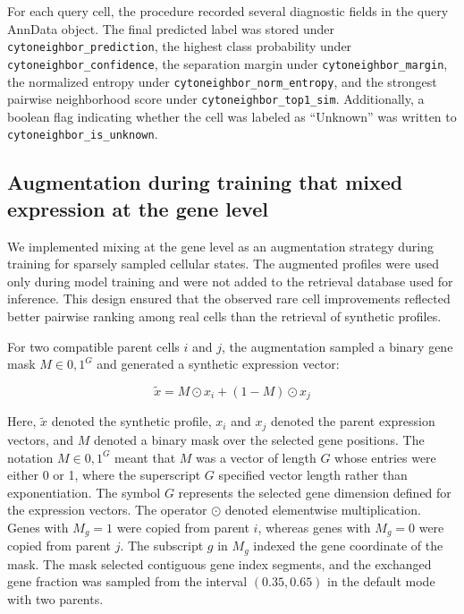 \documentclass[11pt]{article}
\begin{document}
For each query cell, the procedure recorded several diagnostic fields in the query AnnData object. The final predicted label was stored under \texttt{cytoneighbor\_prediction}, the highest class probability under \texttt{cytoneighbor\_confidence}, the separation margin under \texttt{cytoneighbor\_margin}, the normalized entropy under \texttt{cytoneighbor\_norm\_entropy}, and the strongest pairwise neighborhood score under \texttt{cytoneighbor\_top1\_sim}. Additionally, a boolean flag indicating whether the cell was labeled as ``Unknown'' was written to \texttt{cytoneighbor\_is\_unknown}.

\subsection*{Augmentation during training that mixed expression at the gene level}

We implemented mixing at the gene level as an augmentation strategy during training for sparsely sampled cellular states. The augmented profiles were used only during model training and were not added to the retrieval database used for inference. This design ensured that the observed rare cell improvements reflected better pairwise ranking among real cells than the retrieval of synthetic profiles.

For two compatible parent cells $i$ and $j$, the augmentation sampled a binary gene mask $M\in{0,1}^{G}$ and generated a synthetic expression vector:

\begin{equation}
\tilde{x}=
M\odot x_i+
(1-M)\odot x_j
  \label{eq:mix2}
\end{equation}

Here, \(\tilde{x}\) denoted the synthetic profile, \(x_i\) and \(x_j\) denoted the parent expression vectors, and \(M\) denoted a binary mask over the selected gene positions. The notation \(M\in{0,1}^{G}\) meant that \(M\) was a vector of length \(G\) whose entries were either 0 or 1, where the superscript \(G\) specified vector length rather than exponentiation. The symbol \(G\) represents the selected gene dimension defined for the expression vectors. The operator \(\odot\) denoted elementwise multiplication. Genes with \(M_g=1\) were copied from parent \(i\), whereas genes with \(M_g=0\) were copied from parent \(j\). The subscript \(g\) in \(M_g\) indexed the gene coordinate of the mask. The mask selected contiguous gene index segments, and the exchanged gene fraction was sampled from the interval \((0.35,0.65)\) in the default mode with two parents.
\end{document}
